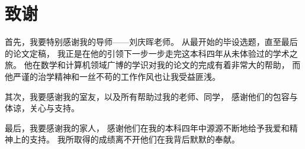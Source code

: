
\chapter*{致谢}

首先，我要特别感谢我的导师——刘庆晖老师。
从最开始的毕设选题，直至最后的论文定稿，
我正是在他的引领下一步一步走完这本科四年从未体验过的学术之旅。
他在数学和计算机领域广博的学识对我的论文的完成有着非常大的帮助，
而他严谨的治学精神和一丝不苟的工作作风也让我受益匪浅。

其次，我要感谢我的室友，以及所有帮助过我的老师、同学，
感谢他们的包容与体谅，关心与支持。

最后，我要感谢我的家人，
感谢他们在我的本科四年中源源不断地给予我爱和精神上的支持。
我所取得的成绩离不开他们在我背后默默的奉献。
